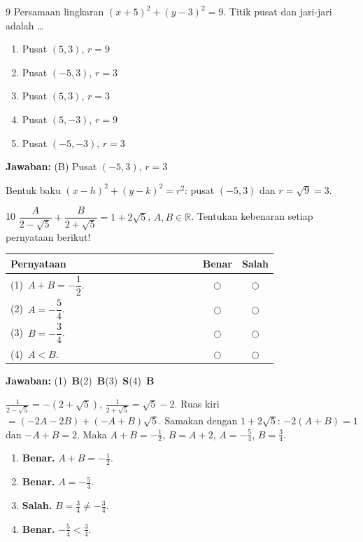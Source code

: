 \documentclass[11pt]{article}
\newcommand{\jawaban}[1]{%
  \noindent\colorbox{gold!30}{\parbox{\dimexpr\linewidth-2\fboxsep\relax}{%
    \textbf{Jawaban:} #1}}\par\smallskip}
\newenvironment{pil}{%
  \begin{enumerate}[label=(\Alph*),leftmargin=*,itemsep=1pt,topsep=3pt]}%
  {\end{enumerate}}
\begin{document}
\begin{soal}{9}
Persamaan lingkaran $(x+5)^2+(y-3)^2=9$. Titik pusat dan jari-jari adalah \ldots
\begin{pil}
  \item Pusat $(5,3)$, $r=9$ \item Pusat $(-5,3)$, $r=3$
  \item Pusat $(5,3)$, $r=3$ \item Pusat $(5,-3)$, $r=9$
  \item Pusat $(-5,-3)$, $r=3$
\end{pil}
\end{soal}
\begin{pembox}
\jawaban{(B) Pusat $(-5,3)$, $r=3$}
Bentuk baku $(x-h)^2+(y-k)^2=r^2$: pusat $(-5,3)$ dan $r=\sqrt{9}=3$.
\end{pembox}

\begin{soal}{10}
$\dfrac{A}{2-\sqrt{5}}+\dfrac{B}{2+\sqrt{5}}=1+2\sqrt{5}$, $A,B\in\mathbb{R}$.
Tentukan kebenaran setiap pernyataan berikut!

\par\smallskip
{\renewcommand{\arraystretch}{1.4}%
\begin{tabular}{@{}p{0.76\linewidth}cc@{}}
\hline\textbf{Pernyataan}&\textbf{Benar}&\textbf{Salah}\\\hline
(1)~$A+B=-\dfrac{1}{2}$.&$\bigcirc$&$\bigcirc$\\
(2)~$A=-\dfrac{5}{4}$.&$\bigcirc$&$\bigcirc$\\
(3)~$B=-\dfrac{3}{4}$.&$\bigcirc$&$\bigcirc$\\
(4)~$A<B$.&$\bigcirc$&$\bigcirc$\\\hline
\end{tabular}}
\end{soal}
\begin{pembox}
\jawaban{(1)~\textbf{B}\quad(2)~\textbf{B}\quad(3)~\textbf{S}\quad(4)~\textbf{B}}
$\tfrac{1}{2-\sqrt5}=-(2+\sqrt5)$, $\tfrac{1}{2+\sqrt5}=\sqrt5-2$.
Ruas kiri $=(-2A-2B)+(-A+B)\sqrt5$. Samakan dengan $1+2\sqrt5$:
$-2(A+B)=1$ dan $-A+B=2$. Maka $A+B=-\tfrac12$, $B=A+2$, $A=-\tfrac54$, $B=\tfrac34$.
\begin{enumerate}[leftmargin=*,topsep=2pt,itemsep=2pt]
\item \textbf{Benar.} $A+B=-\tfrac12$.
\item \textbf{Benar.} $A=-\tfrac54$.
\item \textbf{Salah.} $B=\tfrac34\neq-\tfrac34$.
\item \textbf{Benar.} $-\tfrac54<\tfrac34$.
\end{enumerate}
\end{pembox}
\end{document}
